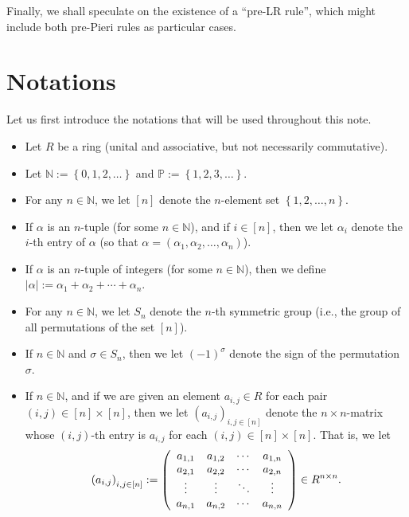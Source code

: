 \documentclass[numbers=enddot,12pt,final,onecolumn,notitlepage,english]{scrartcl}%
\theoremstyle{definition}
\begin{document}
Finally, we shall speculate on the existence of a \textquotedblleft pre-LR
rule\textquotedblright, which might include both pre-Pieri rules as particular cases.

\section{Notations}

Let us first introduce the notations that will be used throughout this note.

\begin{itemize}
\item Let $R$ be a ring (unital and associative, but not necessarily commutative).

\item Let $\mathbb{N}:=\left\{  0,1,2,\ldots\right\}  $ and $\mathbb{P}%
:=\left\{  1,2,3,\ldots\right\}  $.

\item For any $n\in\mathbb{N}$, we let $\left[  n\right]  $ denote the
$n$-element set $\left\{  1,2,\ldots,n\right\}  $.

\item If $\alpha$ is an $n$-tuple (for some $n\in\mathbb{N}$), and if
$i\in\left[  n\right]  $, then we let $\alpha_{i}$ denote the $i$-th entry of
$\alpha$ (so that $\alpha=\left(  \alpha_{1},\alpha_{2},\ldots,\alpha
_{n}\right)  $).

\item If $\alpha$ is an $n$-tuple of integers (for some $n\in\mathbb{N}$),
then we define $\left\vert \alpha\right\vert :=\alpha_{1}+\alpha_{2}%
+\cdots+\alpha_{n}$.

\item For any $n\in\mathbb{N}$, we let $S_{n}$ denote the $n$-th symmetric
group (i.e., the group of all permutations of the set $\left[  n\right]  $).

\item If $n\in\mathbb{N}$ and $\sigma\in S_{n}$, then we let $\left(
-1\right)  ^{\sigma}$ denote the sign of the permutation $\sigma$.

\item If $n\in\mathbb{N}$, and if we are given an element $a_{i,j}\in R$ for
each pair $\left(  i,j\right)  \in\left[  n\right]  \times\left[  n\right]  $,
then we let $\left(  a_{i,j}\right)  _{i,j\in\left[  n\right]  }$ denote the
$n\times n$-matrix whose $\left(  i,j\right)  $-th entry is $a_{i,j}$ for each
$\left(  i,j\right)  \in\left[  n\right]  \times\left[  n\right]  $. That is,
we let%
\[
\left(  a_{i,j}\right)  _{i,j\in\left[  n\right]  }:=\left(
\begin{array}
[c]{cccc}%
a_{1,1} & a_{1,2} & \cdots & a_{1,n}\\
a_{2,1} & a_{2,2} & \cdots & a_{2,n}\\
\vdots & \vdots & \ddots & \vdots\\
a_{n,1} & a_{n,2} & \cdots & a_{n,n}%
\end{array}
\right)  \in R^{n\times n}.
\]



\end{itemize}
\end{document}
